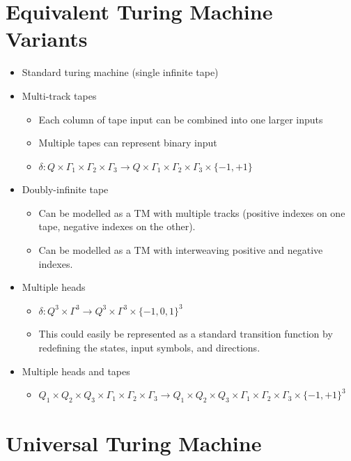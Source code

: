 
\section{Equivalent Turing Machine Variants}
\begin{itemize}
    \item Standard turing machine (single infinite tape)
    \item Multi-track tapes
    \begin{itemize}
        \item Each column of tape input can be combined into one larger inputs
        \item Multiple tapes can represent binary input
        \item $\delta: Q \times \Gamma_1 \times \Gamma_2 \times \Gamma_3 \rightarrow Q \times \Gamma_1 \times \Gamma_2 \times \Gamma_3 \times \{ -1, +1 \}$
    \end{itemize}
    \item Doubly-infinite tape
    \begin{itemize}
        \item Can be modelled as a TM with multiple tracks (positive indexes on one tape, negative indexes on the other).
        \item Can be modelled as a TM with interweaving positive and negative indexes.
    \end{itemize}
    \item Multiple heads
    \begin{itemize}
        \item $\delta: Q^3 \times \Gamma^3 \rightarrow Q^3 \times \Gamma^3 \times \{ -1, 0, 1\}^3$
        \item This could easily be represented as a standard transition function by redefining the states, input symbols, and directions.
    \end{itemize}
    \item Multiple heads and tapes
    \begin{itemize}
        \item $Q_1 \times Q_2 \times Q_3 \times \Gamma_1 \times \Gamma_2 \times \Gamma_3 \rightarrow Q_1 \times Q_2 \times Q_3 \times \Gamma_1 \times \Gamma_2 \times \Gamma_3 \times \{ -1, +1 \}^3$
    \end{itemize}
\end{itemize}

\section{Universal Turing Machine}

